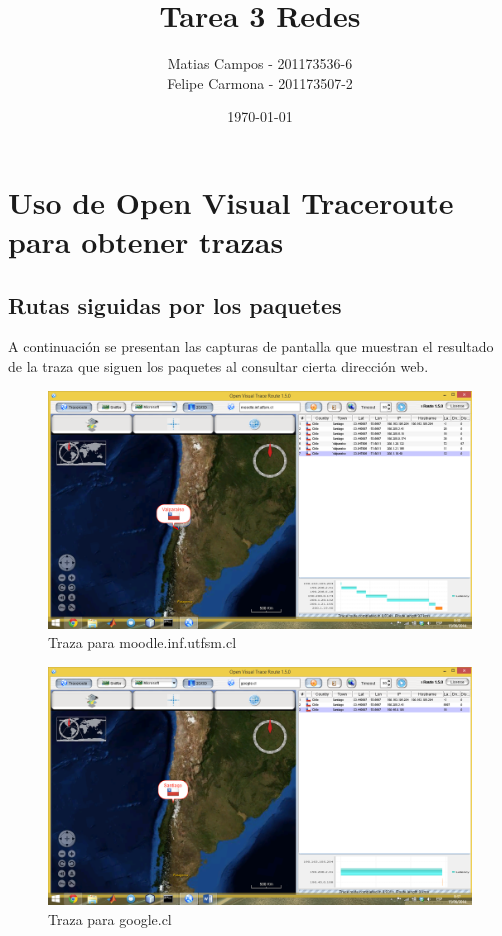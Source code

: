 \documentclass[a4paper]{article}
\title{Tarea 3 Redes}
\author{Matias Campos - 201173536-6 \\ Felipe Carmona - 201173507-2}
\date{\today}
\begin{document}
\maketitle

\section{Uso de Open Visual Traceroute para obtener trazas}

\subsection{Rutas siguidas por los paquetes}

A continuación se presentan las capturas de pantalla que muestran el resultado de la traza que siguen los paquetes al consultar cierta dirección web.

\begin{figure}[H]
\centering
\includegraphics[width=1\textwidth]{moodle.png}
\caption{\label{fig:moodle}Traza para moodle.inf.utfsm.cl}
\end{figure}

\begin{figure}[H]
\centering
\includegraphics[width=1\textwidth]{google_cl.png}
\caption{\label{fig:google}Traza para google.cl}
\end{figure}
\end{document}
